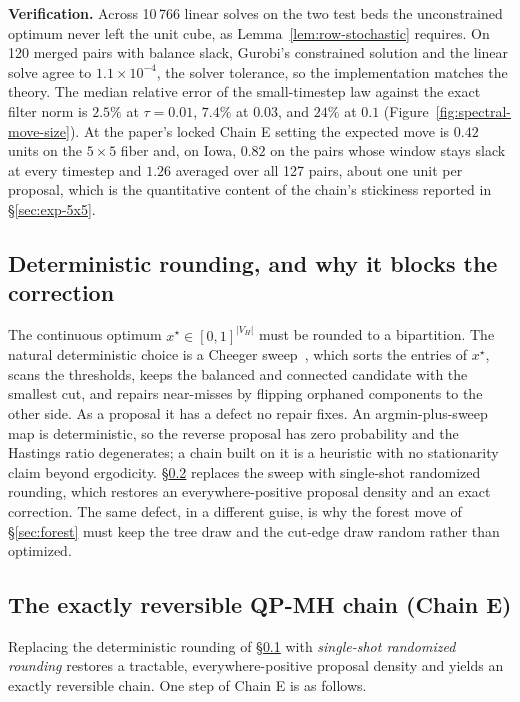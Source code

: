 \documentclass[11pt]{article}
\begin{document}
\textbf{Verification.} Across 10\,766 linear solves on the two test
beds the unconstrained optimum never left the unit cube, as
Lemma~\ref{lem:row-stochastic} requires. On 120 merged pairs with
balance slack, Gurobi's constrained solution and the linear solve
agree to $1.1 \times 10^{-4}$, the solver tolerance, so the
implementation matches the theory. The median relative error of the
small-timestep law against the exact filter norm is $2.5\%$ at
$\tau = 0.01$, $7.4\%$ at $0.03$, and $24\%$ at $0.1$
(Figure~\ref{fig:spectral-move-size}). At the paper's locked Chain E
setting the expected move is $0.42$ units on the $5 \times 5$ fiber
and, on Iowa, $0.82$ on the pairs whose window stays slack at every
timestep and $1.26$ averaged over all 127 pairs, about one unit per
proposal, which is the quantitative content of the chain's stickiness
reported in \S\ref{sec:exp-5x5}.

\subsection{Deterministic rounding, and why it blocks the correction}\label{sec:rounding}

The continuous optimum $x^\star \in [0,1]^{|V_H|}$ must be rounded to
a bipartition. The natural deterministic choice is a Cheeger
sweep~\cite{chung1997spectral}, which sorts the entries of $x^\star$,
scans the thresholds, keeps the balanced and connected candidate with
the smallest cut, and repairs near-misses by flipping orphaned
components to the other side. As a proposal it has a defect no repair
fixes. An argmin-plus-sweep map is deterministic, so the reverse
proposal has zero probability and the Hastings ratio degenerates; a
chain built on it is a heuristic with no stationarity claim beyond
ergodicity. \S\ref{sec:qp-mh} replaces the sweep with single-shot
randomized rounding, which restores an everywhere-positive proposal
density and an exact correction. The same defect, in a different
guise, is why the forest move of \S\ref{sec:forest} must keep the
tree draw and the cut-edge draw random rather than optimized.

\subsection{The exactly reversible QP-MH chain (Chain E)}\label{sec:qp-mh}

Replacing the deterministic rounding of \S\ref{sec:rounding} with
\emph{single-shot randomized rounding} restores a tractable,
everywhere-positive proposal density and yields an exactly reversible
chain. One step of Chain E is as follows.
\end{document}
